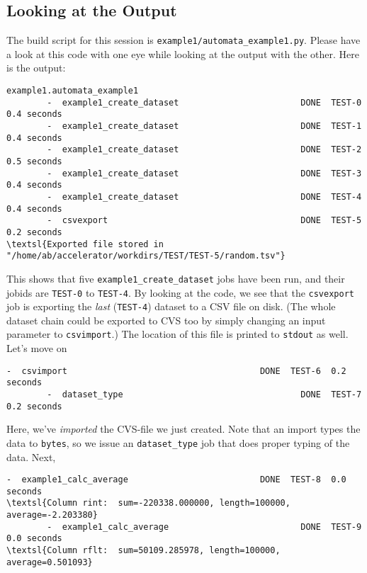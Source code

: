 \documentclass[a4paper]{article}
\begin{document}
\subsection*{Looking at the Output}
The build script for this session is
\texttt{example1/automata\_example1.py}.  Please have a look at this
code with one eye while looking at the output with the other.  Here is the output:
\begin{snugshade}
\begin{Verbatim}[commandchars=\\\{\}]
example1.automata_example1
        -  example1_create_dataset                        DONE  TEST-0  0.4 seconds
        -  example1_create_dataset                        DONE  TEST-1  0.4 seconds
        -  example1_create_dataset                        DONE  TEST-2  0.5 seconds
        -  example1_create_dataset                        DONE  TEST-3  0.4 seconds
        -  example1_create_dataset                        DONE  TEST-4  0.4 seconds
        -  csvexport                                      DONE  TEST-5  0.2 seconds
\textsl{Exported file stored in "/home/ab/accelerator/workdirs/TEST/TEST-5/random.tsv"}
\end{Verbatim}
\end{snugshade}
\noindent This shows that five \texttt{example1\_create\_dataset} jobs have been
run, and their jobids are \texttt{TEST-0} to \texttt{TEST-4}.  By
looking at the code, we see that the \texttt{csvexport} job is
exporting the \textsl{last} (\texttt{TEST-4}) dataset to a CSV file on
disk.  (The whole dataset chain could be exported to CVS too by simply
changing an input parameter to \texttt{csvimport}.) The location of
this file is printed to \texttt{stdout} as well.  Let's move on
\begin{snugshade}
\begin{Verbatim}[commandchars=\\\{\}]
        -  csvimport                                      DONE  TEST-6  0.2 seconds
        -  dataset_type                                   DONE  TEST-7  0.2 seconds
\end{Verbatim}
\end{snugshade}
\noindent Here, we've \textsl{imported} the CVS-file we just created.  Note
that an import types the data to \texttt{bytes}, so we issue an
\texttt{dataset\_type} job that does proper typing of the data.  Next,
\begin{snugshade}
\begin{Verbatim}[commandchars=\\\{\}]
        -  example1_calc_average                          DONE  TEST-8  0.0 seconds
\textsl{Column rint:  sum=-220338.000000, length=100000, average=-2.203380}
        -  example1_calc_average                          DONE  TEST-9  0.0 seconds
\textsl{Column rflt:  sum=50109.285978, length=100000, average=0.501093}
\end{Verbatim}
\end{snugshade}
\end{document}
